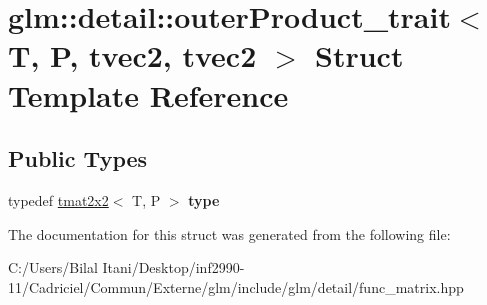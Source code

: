 \hypertarget{structglm_1_1detail_1_1outer_product__trait_3_01_t_00_01_p_00_01tvec2_00_01tvec2_01_4}{}\section{glm\+:\+:detail\+:\+:outer\+Product\+\_\+trait$<$ T, P, tvec2, tvec2 $>$ Struct Template Reference}
\label{structglm_1_1detail_1_1outer_product__trait_3_01_t_00_01_p_00_01tvec2_00_01tvec2_01_4}
\subsection*{Public Types}
\begin{DoxyCompactItemize}
\item 
typedef \hyperlink{structglm_1_1detail_1_1tmat2x2}{tmat2x2}$<$ T, P $>$ {\bfseries type}\hypertarget{structglm_1_1detail_1_1outer_product__trait_3_01_t_00_01_p_00_01tvec2_00_01tvec2_01_4_a390fb582fa7caa73e53f69181b3b334e}{}\label{structglm_1_1detail_1_1outer_product__trait_3_01_t_00_01_p_00_01tvec2_00_01tvec2_01_4_a390fb582fa7caa73e53f69181b3b334e}

\end{DoxyCompactItemize}


The documentation for this struct was generated from the following file\+:\begin{DoxyCompactItemize}
\item 
C\+:/\+Users/\+Bilal Itani/\+Desktop/inf2990-\/11/\+Cadriciel/\+Commun/\+Externe/glm/include/glm/detail/func\+\_\+matrix.\+hpp\end{DoxyCompactItemize}
